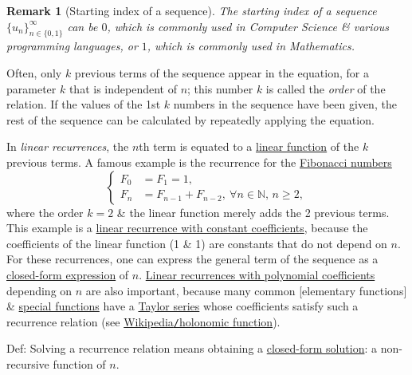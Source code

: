 \documentclass{article}
\newtheorem{remark}{Remark}
\begin{document}
\begin{remark}[Starting index of a sequence]
	The starting index of a sequence $\{u_n\}_{n\in\{0,1\}}^\infty$ can be $0$, which is commonly used in Computer Science \& various programming languages, or $1$, which is commonly used in Mathematics.
\end{remark}
Often, only $k$ previous terms of the sequence appear in the equation, for a parameter $k$ that is independent of $n$; this number $k$ is called the {\it order} of the relation. If the values of the 1st $k$ numbers in the sequence have been given, the rest of the sequence can be calculated by repeatedly applying the equation.

In {\it linear recurrences}, the $n$th term is equated to a \href{https://en.wikipedia.org/wiki/Linear_function}{linear function} of the $k$ previous terms. A famous example is the recurrence for the \href{https://en.wikipedia.org/wiki/Fibonacci_number}{Fibonacci numbers}
\begin{equation}
	\label{Fibonacci sequence}
	\tag{Fib}
	\left\{\begin{split}
		F_0 & = F_1 = 1,\\
		F_n &= F_{n-1} + F_{n-2},\ \forall n\in\mathbb{N},\,n\ge2,
	\end{split}\right.
\end{equation}
where the order $k = 2$ \& the linear function merely adds the 2 previous terms. This example is a \href{https://en.wikipedia.org/wiki/Linear_recurrence_with_constant_coefficients}{linear recurrence with constant coefficients}, because the coefficients of the linear function (1 \& 1) are constants that do not depend on $n$. For these recurrences, one can express the general term of the sequence as a \href{https://en.wikipedia.org/wiki/Closed-form_expression}{closed-form expression} of $n$. \href{https://en.wikipedia.org/wiki/P-recursive_equation}{Linear recurrences with polynomial coefficients} depending on $n$ are also important, because many common \href{https://en.wikipedia.org/wiki/Elementary_functions}[elementary functions] \& \href{https://en.wikipedia.org/wiki/Special_functions}{special functions} have a \href{https://en.wikipedia.org/wiki/Taylor_series}{Taylor series} whose coefficients satisfy such a recurrence relation (see \href{https://en.wikipedia.org/wiki/Holonomic_function}{Wikipedia{\tt/}holonomic function}).

Def: Solving a recurrence relation means obtaining a \href{https://en.wikipedia.org/wiki/Closed-form_solution}{closed-form solution}: a non-recursive function of $n$.
\end{document}
